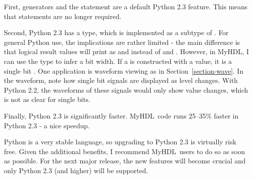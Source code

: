 \documentclass{howto}
\newcommand{\myhdl}{\protect \mbox{MyHDL}}
\begin{document}
First, generators and the  statement are a default Python
2.3 feature. This means that 
statements are no longer required.

Second, Python 2.3 has a  type, which is implemented as a
subtype of . For general Python use, the implications are
rather limited - the main difference is that logical result values
will print as  and  instead of  and
. However, in \myhdl{}, I can use the  type to
infer a bit width.  If a  is constructed with a
 value, it is a single bit . One application
is waveform viewing as in Section~\ref{section-wave}. In the waveform,
note how single bit signals are displayed as level changes.  With
Python 2.2, the waveforms of these signals would only show value
changes, which is not as clear for single bits.

Finally, Python 2.3 is significantly faster. \myhdl\ code runs
25--35\% faster in Python 2.3 - a nice speedup.

Python is a very stable language, so upgrading to Python 2.3 is
virtually risk free. Given the additional benefits, I recommend
\myhdl\ users to do so as soon as possible. For the next major
release, the new features will become crucial and only Python 2.3 (and
higher) will be supported.
\end{document}
